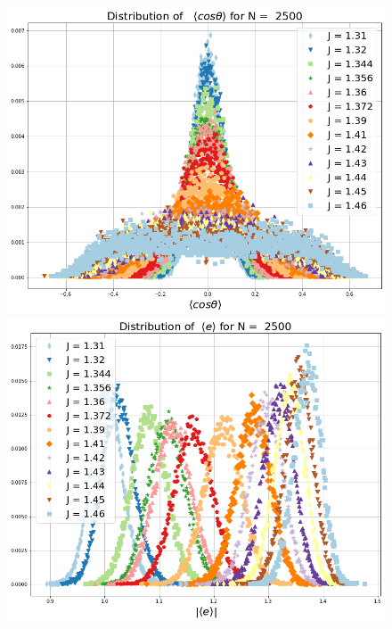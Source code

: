 

  \begin{figure}
 	\centering
 	\includegraphics[scale=0.25]{Images/distr_cos_2500.png}
 	\includegraphics[scale=0.25]{Images/distr_energy_2500.png}

\end{figure}
